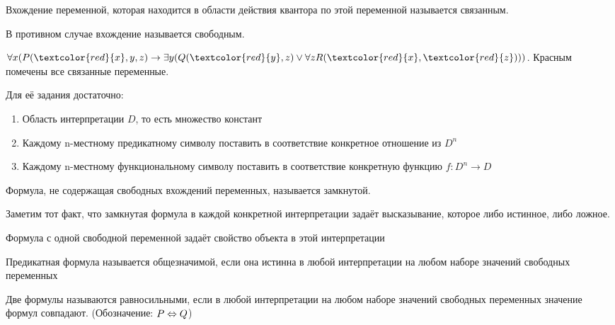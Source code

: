 \documentclass[main]{subfiles}
\begin{document}
\begin{definition}
    Вхождение переменной, которая находится в области действия квантора по этой переменной называется связанным.
\end{definition}
\begin{definition}
    В противном случае вхождение называется свободным.
\end{definition}
\begin{example}
    $\forall x (P(\textcolor{red}{x},y,z) \to \exists y (Q(\textcolor{red}{y}, z) \lor \forall z R(\textcolor{red}{x}, \textcolor{red}{z})))$. Красным помечены все связанные переменные.
\end{example}
\begin{definition}[Интерпретация]
    Для её задания достаточно:
    \begin{enumerate}
        \item Область интерпретации $D$, то есть множество констант
        \item Каждому n-местному предикатному символу поставить в соответствие конкретное отношение из $D^n$
        \item Каждому n-местному функциональному символу поставить в соответствие конкретную функцию $f: D^n \to D$
    \end{enumerate}
\end{definition}
\begin{definition}
    Формула, не содержащая свободных вхождений переменных, называется замкнутой.
\end{definition}
Заметим тот факт, что замкнутая формула в каждой конкретной интерпретации задаёт высказывание, которое либо истинное, либо ложное.
\begin{definition}[Свойство]
    Формула с одной свободной переменной задаёт свойство объекта в этой интерпретации
\end{definition}
\begin{definition}[Общезначимость]
    Предикатная формула называется общезначимой, если она истинна в любой интерпретации на любом наборе значений свободных переменных
\end{definition}
\begin{definition}[Равносильность]
    Две формулы называются равносильными, если в любой интерпретации на любом наборе значений свободных переменных значение формул совпадают. (Обозначение: $P \Leftrightarrow Q$)
\end{definition}
\end{document}
